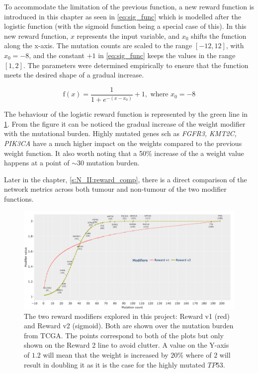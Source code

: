 To accommodate the limitation of the previous function, a new reward function is introduced in this chapter as seen in \cref{eq:sig_func} which is modelled after the logistic function (with the sigmoid function being a special case of this). In this new reward function, $x$ represents the input variable, and $x_0$ shifts the function along the x-axis. The mutation counts are scaled to the range $[-12, 12]$, with $x_0 = -8$, and the constant $+1$ in \cref{eq:sig_func} keeps the values in the range $[1, 2]$. The parameters were determined empirically to ensure that the function meets the desired shape of a gradual increase.

\begin{equation} \label{eq:sig_func}
\text{f}(x) =  \frac{1}{1 + e^{-(x - x_0)}} + 1, \text{ where } x_0=-8
\end{equation}

The behaviour of the logistic reward function is represented by the green line in \cref{fig:N_II:modifiers_comp}. From the figure it can be noticed the gradual increase of the weight modifier with the mutational burden. Highly mutated genes sch as \textit{FGFR3, KMT2C, PIK3CA} have a much higher impact on the weights compared to the previous weight function. It also worth noting that a 50\% increase of the a weight value happens at a point of $\sim30$ mutation burden.

Later in the chapter, \cref{s:N_II:reward_comp}, there is a direct comparison of the network metrics across both tumour and non-tumour of the two modifier functions.

\begin{figure}[H]    
    \centering
    \includegraphics[width=1.0\textwidth,height=1.0\textheight,keepaspectratio]{Sections/Network_II/validation/reward_modifiers.png}
    \caption{The two reward modifiers explored in this project: Reward v1 (red) and Reward v2 (sigmoid). Both are shown over the mutation burden from TCGA. The points correspond to both of the plots but only shown on the Reward 2 line to avoid clutter. A value on the Y-axis of $1.2$ will mean that the weight is increased by $20\%$ where of $2$ will result in doubling it as it is the case for the highly mutated $TP53$. }
    \label{fig:N_II:modifiers_comp}
\end{figure}


